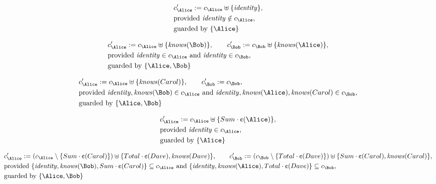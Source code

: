 \begin{align*}
&
c'_
{
\Alice
}
 := 
c_
{
\Alice
}
 \uplus 
\{
\mathit{
identity
}
\}
,\\
&
\text{provided } 
\mathit{
identity
}
 \notin c_
{
\Alice
}
,\\
&
\text{guarded by } \{
\Alice
\}
\end{align*}

\begin{align*}
&
c'_
{
\Alice
}
 := 
c_
{
\Alice
}
 \uplus 
\{
\mathit{
knows
}
(
\Bob
)
\}
, \qquad 
c'_
{
\Bob
}
 := 
c_
{
\Bob
}
 \uplus 
\{
\mathit{
knows
}
(
\Alice
)
\}
,\\
&
\text{provided } 
\mathit{
identity
}
 \in c_
{
\Alice
}
 \text{ and } 
\mathit{
identity
}
 \in c_
{
\Bob
}
,\\
&
\text{guarded by } \{
\Alice
,
\Bob
\}
\end{align*}

\begin{align*}
&
c'_
{
\Alice
}
 := 
c_
{
\Alice
}
 \uplus 
\{
\mathit{
knows
}
(
Carol
)
\}
, \qquad 
c'_
{
\Bob
}
 := 
c_
{
\Bob
}
,\\
&
\text{provided } 
\mathit{
identity
}
,
\mathit{
knows
}
(
\Bob
)
 \in c_
{
\Alice
}
 \text{ and } 
\mathit{
identity
}
,
\mathit{
knows
}
(
\Alice
)
,
\mathit{
knows
}
(
Carol
)
 \in c_
{
\Bob
}
,\\
&
\text{guarded by } \{
\Alice
,
\Bob
\}
\end{align*}

\begin{align*}
&
c'_
{
\Alice
}
 := 
c_
{
\Alice
}
 \uplus 
\{
Sum
\cdot
\text{\textcent}
(
\Alice
)
\}
,\\
&
\text{provided } 
\mathit{
identity
}
 \in c_
{
\Alice
}
,\\
&
\text{guarded by } \{
\Alice
\}
\end{align*}

\begin{align*}
&
c'_
{
\Alice
}
 := 
(c_
{
\Alice
}
 \setminus 
\{
Sum
\cdot
\text{\textcent}
(
Carol
)
\}
) \uplus 
\{
Total
\cdot
\text{\textcent}
(
Dave
)
,
\mathit{
knows
}
(
Dave
)
\}
, \qquad 
c'_
{
\Bob
}
 := 
(c_
{
\Bob
}
 \setminus 
\{
Total
\cdot
\text{\textcent}
(
Dave
)
\}
) \uplus 
\{
Sum
\cdot
\text{\textcent}
(
Carol
)
,
\mathit{
knows
}
(
Carol
)
\}
,\\
&
\text{provided } 
\{
\mathit{
identity
}
,
\mathit{
knows
}
(
\Bob
)
,
Sum
\cdot
\text{\textcent}
(
Carol
)
\}
 \subseteq c_
{
\Alice
}
 \text{ and } 
\{
\mathit{
identity
}
,
\mathit{
knows
}
(
\Alice
)
,
Total
\cdot
\text{\textcent}
(
Dave
)
\}
 \subseteq c_
{
\Bob
}
,\\
&
\text{guarded by } \{
\Alice
,
\Bob
\}
\end{align*}
